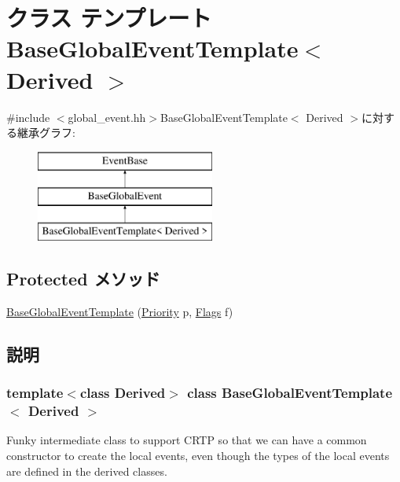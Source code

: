\hypertarget{classBaseGlobalEventTemplate}{
\section{クラス テンプレート BaseGlobalEventTemplate$<$ Derived $>$}
\label{classBaseGlobalEventTemplate}
}


{\ttfamily \#include $<$global\_\-event.hh$>$}BaseGlobalEventTemplate$<$ Derived $>$に対する継承グラフ:\begin{figure}[H]
\begin{center}
\leavevmode
\includegraphics[height=3cm]{classBaseGlobalEventTemplate}
\end{center}
\end{figure}
\subsection*{Protected メソッド}
\begin{DoxyCompactItemize}
\item 
\hyperlink{classBaseGlobalEventTemplate_ad16b63ab345fafbe85063ef44dd46a9a}{BaseGlobalEventTemplate} (\hyperlink{classEventBase_a6d92f7ee8144a5911ed46d85a89a4934}{Priority} p, \hyperlink{classFlags}{Flags} f)
\end{DoxyCompactItemize}


\subsection{説明}
\subsubsection*{template$<$class Derived$>$ class BaseGlobalEventTemplate$<$ Derived $>$}

Funky intermediate class to support CRTP so that we can have a common constructor to create the local events, even though the types of the local events are defined in the derived classes. 

